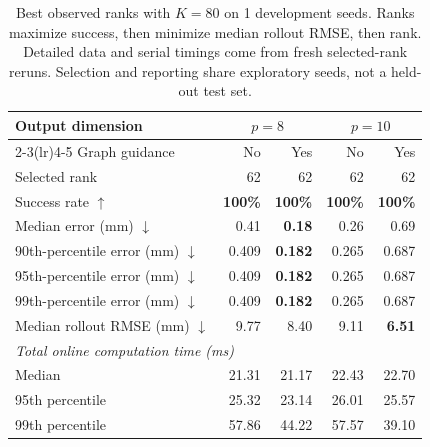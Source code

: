 \begin{table}[htbp]
    \centering
    \small
    \begin{tabular}{lrrrr}
        \toprule
        Output dimension & \multicolumn{2}{c}{$p=8$} & \multicolumn{2}{c}{$p=10$} \\
        \cmidrule(lr){2-3}\cmidrule(lr){4-5}
        Graph guidance & No & Yes & No & Yes \\
        \midrule
        Selected rank & 62 & 62 & 62 & 62 \\
        Success rate $\uparrow$ & \textbf{100\%} & \textbf{100\%} & \textbf{100\%} & \textbf{100\%} \\
        Median error (mm) $\downarrow$ & 0.41 & \textbf{0.18} & 0.26 & 0.69 \\
        90th-percentile error (mm) $\downarrow$ & 0.409 & \textbf{0.182} & 0.265 & 0.687 \\
        95th-percentile error (mm) $\downarrow$ & 0.409 & \textbf{0.182} & 0.265 & 0.687 \\
        99th-percentile error (mm) $\downarrow$ & 0.409 & \textbf{0.182} & 0.265 & 0.687 \\
        Median rollout RMSE (mm) $\downarrow$ & 9.77 & 8.40 & 9.11 & \textbf{6.51} \\
        \midrule
        \multicolumn{5}{l}{\textit{Total online computation time (ms)}} \\
        Median & 21.31 & 21.17 & 22.43 & 22.70 \\
        95th percentile & 25.32 & 23.14 & 26.01 & 25.57 \\
        99th percentile & 57.86 & 44.22 & 57.57 & 39.10 \\
        \bottomrule
    \end{tabular}
    \caption{Best observed ranks with $K=80$ on 1 development seeds. Ranks maximize success, then minimize median rollout RMSE, then rank. Detailed data and serial timings come from fresh selected-rank reruns. Selection and reporting share exploratory seeds, not a held-out test set.}
    \label{tab:best-ranks-k80-compact}
\end{table}
